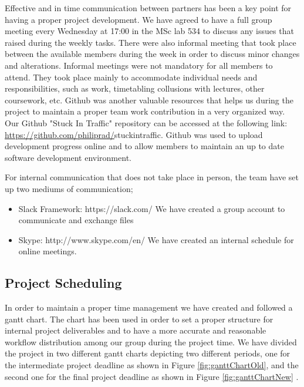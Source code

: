 \documentclass[oneside]{article}
\begin{document}
\noindent Effective and in time communication between partners has been a key point for having a proper project development. We have agreed to have a full group meeting every Wednesday at 17:00 in the MSc lab 534 to discuss any issues that raised during the weekly tasks. There were also informal meeting that took place between the available members during the week in order to discuss minor changes and alterations. Informal meetings were not mandatory for all members to attend. They took place mainly to accommodate individual needs and responsibilities, such as work, timetabling collusions with lectures, other coursework, etc. Github was another valuable resources that helps us during the project to maintain a proper team work contribution in a very organized way. Our Github "Stuck In Traffic" repository can be accessed at the following link: \url{https://github.com/philiprad/}stuckintraffic. Github was used to upload development progress online and to allow members to maintain an up to date software development environment.

\noindent For internal communication that does not take place in person, the team have set up two mediums of communication;

\begin{itemize} \item Slack Framework: https://slack.com/ We have created a group account to communicate and exchange files
\item Skype: http://www.skype.com/en/ We have created an internal schedule for online meetings. \end{itemize} \newpage

\subsection{Project Scheduling}

\noindent In order to maintain a proper time management we have created and followed a gantt chart. The chart has been used in order to set a proper structure for internal project deliverables and to have a more accurate and reasonable workflow distribution among our group during the project time. We have divided the project in two different gantt charts depicting two different periods, one for the intermediate project deadline as shown in Figure \ref{fig:ganttChartOld}, and the second one for the final project deadline as shown in Figure \ref{fig:ganttChartNew} .
\end{document}
